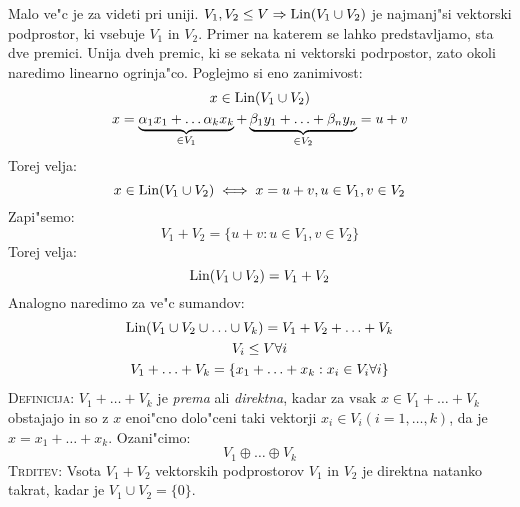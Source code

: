 Malo ve"c je za videti pri uniji. $V_1, V_2 \leq V \Rightarrow \text{Lin} (V_1 \cup V_2)$ je najmanj"si vektorski podprostor, ki vsebuje $V_1$ in $V_2$. Primer na katerem se lahko predstavljamo, sta dve premici. Unija dveh premic, ki se sekata ni vektorski podrpostor, zato okoli naredimo linearno ogrinja"co. Poglejmo si eno zanimivost:
\begin{gather*}
x \in \text{Lin} (V_1 \cup V_2) \\
x = \underbrace{\alpha_1 x_1 + \ldots \alpha_k x_k}_{\in V_1} + \underbrace{\beta_1 y_1 + \ldots + \beta_n y_n}_{\in V_2} = u + v
\end{gather*}
Torej velja:
\begin{equation*}
x \in \text{Lin} (V_1 \cup V_2) \iff x = u + v, u \in V_1, v \in V_2
\end{equation*}
Zapi"semo:
\begin{equation*}
V_1 + V_2 = \{u + v: u \in V_1, v \in V_2\}
\end{equation*}
Torej velja:
\begin{equation*}
\text{Lin} (V_1 \cup V_2) = V_1 + V_2
\end{equation*}
Analogno naredimo za ve"c sumandov:
\begin{gather*}
	\text{Lin} (V_1 \cup V_2 \cup \ldots \cup V_k) = V_1 + V_2 + \ldots + V_k \\
	V_i \leq V \forall i \\
	V_1 + \ldots + V_k = \{x_1 + \ldots + x_k: x_i \in V_i \forall i\}
\end{gather*}
\textsc{Definicija:} $V_1 + \ldots + V_k$ je \emph{prema} ali \emph{direktna}, kadar za vsak $x \in V_1 + \ldots + V_k$ obstajajo in so z $x$ enoi"cno dolo"ceni taki vektorji $x_i \in V_i (i = 1, \ldots, k)$, da je $x = x_1 + \ldots + x_k$. Ozani"cimo:
\begin{equation*}
V_1 \oplus \ldots \oplus V_k
\end{equation*}
\textsc{Trditev:} Vsota $V_1 + V_2$ vektorskih podprostorov $V_1$ in $V_2$ je direktna natanko takrat, kadar je $V_1 \cup V_2 = \{0\}$.

